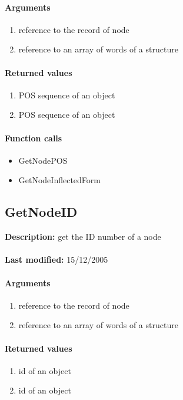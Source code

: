 \paragraph{Arguments}
\begin{enumerate}
\item reference to the record of node
\item reference to an array of words of a structure
\end{enumerate}

\paragraph{Returned values}
\begin{enumerate}
\item POS sequence of an object
\item POS sequence of an object
\end{enumerate}

\paragraph{Function calls}
\begin{itemize}
\item GetNodePOS
\item GetNodeInflectedForm
\end{itemize}

\subsection{GetNodeID}
\textbf{Description:} get the ID number of a node\\
\\\textbf{Last modified:} 15/12/2005

\paragraph{Arguments}
\begin{enumerate}
\item reference to the record of node
\item reference to an array of words of a structure
\end{enumerate}

\paragraph{Returned values}
\begin{enumerate}
\item id of an object
\item id of an object
\end{enumerate}

